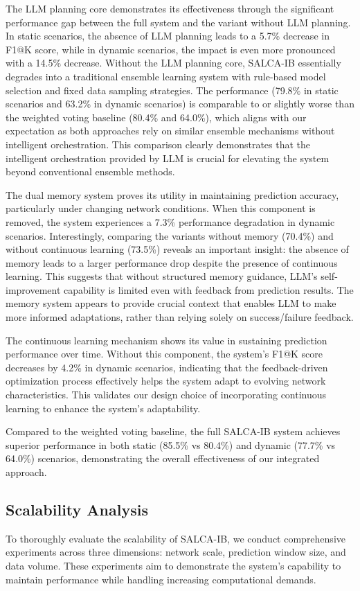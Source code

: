 \documentclass[conference]{IEEEtran}
\begin{document}
The LLM planning core demonstrates its effectiveness through the significant performance gap between the full system and the variant without LLM planning. In static scenarios, the absence of LLM planning leads to a 5.7\% decrease in F1@K score, while in dynamic scenarios, the impact is even more pronounced with a 14.5\% decrease. Without the LLM planning core, SALCA-IB essentially degrades into a traditional ensemble learning system with rule-based model selection and fixed data sampling strategies. The performance (79.8\% in static scenarios and 63.2\% in dynamic scenarios) is comparable to or slightly worse than the weighted voting baseline (80.4\% and 64.0\%), which aligns with our expectation as both approaches rely on similar ensemble mechanisms without intelligent orchestration. This comparison clearly demonstrates that the intelligent orchestration provided by LLM is crucial for elevating the system beyond conventional ensemble methods.

The dual memory system proves its utility in maintaining prediction accuracy, particularly under changing network conditions. When this component is removed, the system experiences a 7.3\% performance degradation in dynamic scenarios. Interestingly, comparing the variants without memory (70.4\%) and without continuous learning (73.5\%) reveals an important insight: the absence of memory leads to a larger performance drop despite the presence of continuous learning. This suggests that without structured memory guidance, LLM's self-improvement capability is limited even with feedback from prediction results. The memory system appears to provide crucial context that enables LLM to make more informed adaptations, rather than relying solely on success/failure feedback.

The continuous learning mechanism shows its value in sustaining prediction performance over time. Without this component, the system's F1@K score decreases by 4.2\% in dynamic scenarios, indicating that the feedback-driven optimization process effectively helps the system adapt to evolving network characteristics. This validates our design choice of incorporating continuous learning to enhance the system's adaptability.

Compared to the weighted voting baseline, the full SALCA-IB system achieves superior performance in both static (85.5\% vs 80.4\%) and dynamic (77.7\% vs 64.0\%) scenarios, demonstrating the overall effectiveness of our integrated approach.

\subsection{Scalability Analysis}
To thoroughly evaluate the scalability of SALCA-IB, we conduct comprehensive experiments across three dimensions: network scale, prediction window size, and data volume. These experiments aim to demonstrate the system's capability to maintain performance while handling increasing computational demands.
\end{document}
